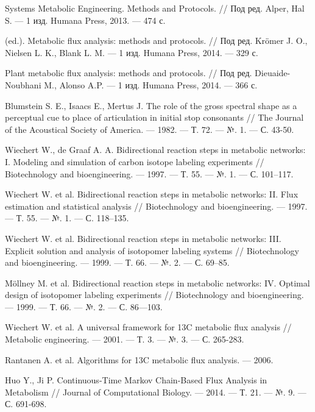 \documentclass[14pt, a4paper]{extreport}
\begin{document}
\begin{thebibliography}{XXXX}
	Systems Metabolic Engineering. Methods and Protocols. // Под ред. Alper, Hal S. --- 1 изд. Humana Press, 2013. --- 474 с.
	
	(ed.). Metabolic flux analysis: methods and protocols. // Под ред. Krömer J. O., Nielsen L. K., Blank L. M. --- 1 изд. Humana Press, 2014. --- 329 с.
	
	Plant metabolic flux analysis: methods and protocols. // Под ред. Dieuaide-Noubhani M., Alonso A.P. --- 1 изд. Humana Press, 2014. --- 366 с.
	
	Blumstein S. E., Isaacs E., Mertus J. The role of the gross spectral shape as a perceptual cue to place of articulation in initial stop consonants // The Journal of the Acoustical Society of America. --- 1982. --- Т. 72. --- №. 1. --- С. 43-50.
	
	Wiechert W., de Graaf A. A. Bidirectional reaction steps in metabolic networks: I. Modeling and simulation of carbon isotope labeling experiments // Biotechnology and bioengineering. --- 1997. --- Т. 55. --- №. 1. --- С. 101--117.
	
	Wiechert W. et al. Bidirectional reaction steps in metabolic networks: II. Flux estimation and statistical analysis // Biotechnology and bioengineering. --- 1997. --- Т. 55. --- №. 1. --- С. 118--135.
	
	Wiechert W. et al. Bidirectional reaction steps in metabolic networks: III. Explicit solution and analysis of isotopomer labeling systems // Biotechnology and bioengineering. --- 1999. --- Т. 66. --- №. 2. --- С. 69--85.
	
	Möllney M. et al. Bidirectional reaction steps in metabolic networks: IV. Optimal design of isotopomer labeling experiments // Biotechnology and bioengineering. --- 1999. --- Т. 66. --- №. 2. --- С. 86---103.
	
	Wiechert W. et al. A universal framework for 13C metabolic flux analysis // Metabolic engineering. --- 2001. --- Т. 3. --- №. 3. --- С. 265-283.
	
	Rantanen A. et al. Algorithms for 13C metabolic flux analysis. --- 2006.
	
	Huo Y., Ji P. Continuous-Time Markov Chain-Based Flux Analysis in Metabolism // Journal of Computational Biology. --- 2014. --- Т. 21. --- №. 9. --- С. 691-698.
	

\end{thebibliography}
\end{document}
